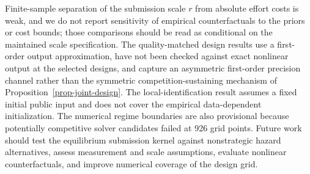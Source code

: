 \documentclass[mnsc]{informs3}
\begin{document}
{Finite-sample separation of the submission scale $r$ from absolute effort costs is weak, and we do not report sensitivity of empirical counterfactuals to the priors or cost bounds; those comparisons should be read as conditional on the maintained scale specification. The quality-matched design results use a first-order output approximation, have not been checked against exact nonlinear output at the selected designs, and capture an asymmetric first-order precision channel rather than the symmetric competition-sustaining mechanism of Proposition~\ref{prop-joint-design}. The local-identification result assumes a fixed initial public input and does not cover the empirical data-dependent initialization. The numerical regime boundaries are also provisional because potentially competitive solver candidates failed at 926 grid points. Future work should test the equilibrium submission kernel against nonstrategic hazard alternatives, assess measurement and scale assumptions, evaluate nonlinear counterfactuals, and improve numerical coverage of the design grid.}




%
%
%
\end{document}

